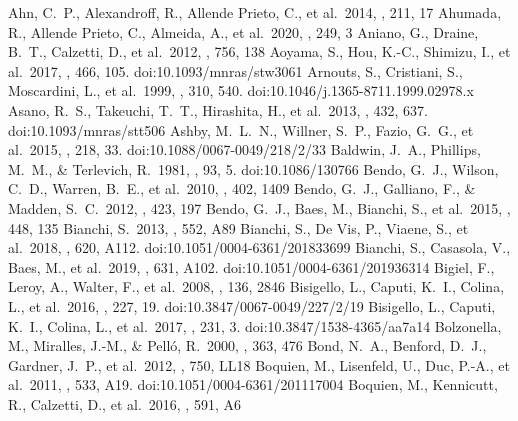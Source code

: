 \documentclass{aa}
\begin{document}
 \begin{thebibliography}{}
  Ahn, C.~P., Alexandroff, R., Allende Prieto, C., et al.\ 2014, \apjs, 211, 17
  Ahumada, R., Allende Prieto, C., Almeida, A., et al.\ 2020, \apjs, 249, 3
  Aniano, G., Draine, B.~T., Calzetti, D., et al.\ 2012, \apj, 756, 138
  Aoyama, S., Hou, K.-C., Shimizu, I., et al.\ 2017, \mnras, 466, 105. doi:10.1093/mnras/stw3061
  Arnouts, S., Cristiani, S., Moscardini, L., et al.\ 1999, \mnras, 310, 540. doi:10.1046/j.1365-8711.1999.02978.x
  Asano, R.~S., Takeuchi, T.~T., Hirashita, H., et al.\ 2013, \mnras, 432, 637. doi:10.1093/mnras/stt506
  Ashby, M.~L.~N., Willner, S.~P., Fazio, G.~G., et al.\ 2015, \apjs, 218, 33. doi:10.1088/0067-0049/218/2/33
  Baldwin, J.~A., Phillips, M.~M., \& Terlevich, R.\ 1981, \pasp, 93, 5. doi:10.1086/130766
  Bendo, G.~J., Wilson, C.~D., Warren, B.~E., et al.\ 2010, \mnras, 402, 1409 
  Bendo, G.~J., Galliano, F., \& Madden, S.~C.\ 2012, \mnras, 423, 197 
  Bendo, G.~J., Baes, M., Bianchi, S., et al.\ 2015, \mnras, 448, 135 
  Bianchi, S.\ 2013, \aap, 552, A89
  Bianchi, S., De Vis, P., Viaene, S., et al.\ 2018, \aap, 620, A112. doi:10.1051/0004-6361/201833699 
  Bianchi, S., Casasola, V., Baes, M., et al.\ 2019, \aap, 631, A102. doi:10.1051/0004-6361/201936314
  Bigiel, F., Leroy, A., Walter, F., et al.\ 2008, \aj, 136, 2846
  Bisigello, L., Caputi, K.~I., Colina, L., et al.\ 2016, \apjs, 227, 19. doi:10.3847/0067-0049/227/2/19
  Bisigello, L., Caputi, K.~I., Colina, L., et al.\ 2017, \apjs, 231, 3. doi:10.3847/1538-4365/aa7a14
  Bolzonella, M., Miralles, J.-M., \& Pell{\'o}, R.\ 2000, \aap, 363, 476
  Bond, N.~A., Benford, D.~J., Gardner, J.~P., et al.\ 2012, \apjl, 750, LL18
  Boquien, M., Lisenfeld, U., Duc, P.-A., et al.\ 2011, \aap, 533, A19. doi:10.1051/0004-6361/201117004
  Boquien, M., Kennicutt, R., Calzetti, D., et al.\ 2016, \aap, 591, A6

\end{thebibliography}
\end{document}

